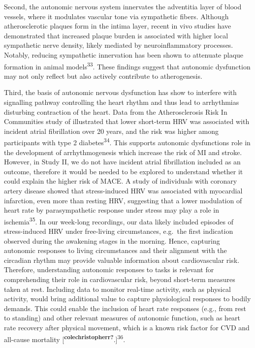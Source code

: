 \documentclass[
  a4paper,
  headsepline=true,
  open=any]{scrbook}
\begin{document}
Second, the autonomic nervous system innervates the adventitia layer of
blood vessels, where it modulates vascular tone via sympathetic fibers.
Although atherosclerotic plaques form in the intima layer, recent in
vivo studies have demonstrated that increased plaque burden is
associated with higher local sympathetic nerve density, likely mediated
by neuroinflammatory processes. Notably, reducing sympathetic
innervation has been shown to attenuate plaque formation in animal
models\textsuperscript{33}. These findings suggest that autonomic
dysfunction may not only reflect but also actively contribute to
atherogenesis.

Third, the basis of autonomic nervous dysfunction has show to interfere
with signalling pathway controlling the heart rhythm and thus lead to
arrhythmias disturbing contraction of the heart. Data from the
Atherosclerosis Risk In Communities study of illustrated that lower
short-term HRV was associated with incident atrial fibrillation over 20
years, and the risk was higher among participants with type 2
diabetes\textsuperscript{34}. This supports autonomic dysfunctions role
in the development of arrhythmogenesis which increase the risk of MI and
stroke. However, in Study II, we do not have incident atrial
fibrillation included as an outcome, therefore it would be needed to be
explored to understand whether it could explain the higher risk of MACE.
A study of individuals with coronary artery disease showed that
stress-induced HRV was associated with myocardial infarction, even more
than resting HRV, suggesting that a lower modulation of heart rate by
parasympathetic response under stress may play a role in
ischemia\textsuperscript{35}. In our week-long recordings, our data
likely included episodes of stress-induced HRV under free-living
circumstances, e.g.~the first indication observed during the awakening
stages in the morning. Hence, capturing autonomic responses to living
circumstances and their alignment with the circadian rhythm may provide
valuable information about cardiovascular risk. Therefore, understanding
autonomic responses to tasks is relevant for comprehending their role in
cardiovascular risk, beyond short-term measures taken at rest. Including
data to monitor real-time activity, such as physical activity, would
bring additional value to capture physiological responses to bodily
demands. This could enable the inclusion of heart rate responses (e.g.,
from rest to standing) and other relevant measures of autonomic
function, such as heart rate recovery after physical movement, which is
a known risk factor for CVD and all-cause mortality
{[}\textsuperscript{\textbf{colechristopherr?}}.{]}\textsuperscript{36}.
\end{document}
